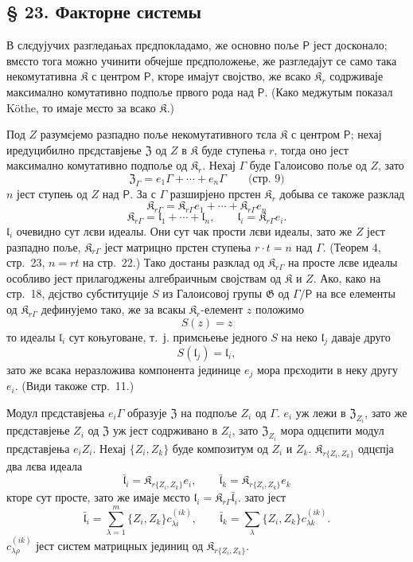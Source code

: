 \documentclass[11pt]{article}
\newcommand{\foreign}[1]{#1}
\begin{document}
\subsection*{§ 23. Факторне системы}\label{faktorensysteme}

В слєдујучих разгледањах прєдпокладамо, же основно поље \(\mathsf P\) јест досконало; вмєсто тога можно учинити обчејше прєдположење, же разгледајут се само така некомутативна \(\mathfrak K\) с центром \(\mathsf P\), кторе имајут својство, же всако \(\mathfrak K_r\) содрживаје максимално комутативно подпоље првого рода над \(\mathsf P\). (Како меджутым показал \foreign{Köthe}, то имаје мєсто за всако \(\mathfrak K\).)

Под \(Z\) разумєјемо разпадно поље некомутативного тєла \(\mathfrak K\) с центром \(\mathsf P\); нехај иредуцибилно прєдставјење \(\mathfrak Z\) од \(Z\) в \(\mathfrak K\) буде ступења \(r\), тогда оно јест максимално комутативно подпоље од \(\mathfrak K_r\). Нехај \(\Gamma\) буде Галоисово поље од \(Z\), зато
\[
\mathfrak Z_\Gamma=e_1\Gamma+\cdots+e_n\Gamma
\qquad\text{(стр.~9)}
\]
\(n\) јест ступењ од \(Z\) над \(\mathsf P\). За с \(\Gamma\) разширјено прстен \(\mathfrak K_r\) добыва се такоже разклад
\[
\mathfrak K_{r\Gamma}=\mathfrak K_{r\Gamma}e_1+\cdots+\mathfrak K_{r\Gamma}e_n
\]
\[
\mathfrak K_{r\Gamma}=\mathfrak l_1+\cdots+\mathfrak l_n,\qquad
\mathfrak l_i=\mathfrak K_{r\Gamma}e_i.
\]
\(\mathfrak l_i\) очевидно сут лєви идеалы. Они сут чак прости лєви идеалы, зато же \(Z\) јест разпадно поље, \(\mathfrak K_{r\Gamma}\) јест матрицно прстен ступења \(r\cdot t=n\) над \(\Gamma\). (Теорем 4, стр.~23, \(n=rt\) на стр.~22.) Тако достаны разклад од \(\mathfrak K_{r\Gamma}\) на просте лєве идеалы особливо јест прилагоджены алгебраичным својствам од \(\mathfrak K\) и \(Z\). Ако, како на стр.~18, дєјство субституције \(S\) из Галоисовој групы \(\mathfrak G\) од \(\Gamma/\mathsf P\) на все елементы од \(\mathfrak K_{r\Gamma}\) дефинујемо тако, же за всакы \(\mathfrak K_r\)-елемент \(z\) положимо
\[
S(z)=z
\]
то идеалы \(\mathfrak l_i\) сут коњуговане, т.~ј. примєњење једного \(S\) на неко \(\mathfrak l_j\) даваје друго
\[
S(\mathfrak l_j)=\mathfrak l_i,
\]
зато же всака неразложива компонента јединице \(e_j\) мора прєходити в неку другу \(e_i\). (Види такоже стр.~11.)

Модул прєдставјења \(e_i\Gamma\) образује \(\mathfrak Z\) на подпоље \(Z_i\) од \(\Gamma\). \(e_i\) уж лежи в \(\mathfrak Z_{Z_i}\), зато же прєдставјење \(Z_i\) од \(\mathfrak Z\) уж јест содрживано в \(Z_i\), зато \(\mathfrak Z_{Z_i}\) мора одцєпити модул прєдставјења \(e_iZ_i\). Нехај \(\{Z_i,Z_k\}\) буде композитум од \(Z_i\) и \(Z_k\). \(\mathfrak K_{r\{Z_i,Z_k\}}\) одцєпја два лєва идеала
\[
\bar{\mathfrak l}_i=\mathfrak K_{r\{Z_i,Z_k\}}e_i,\qquad
\bar{\mathfrak l}_k=\mathfrak K_{r\{Z_i,Z_k\}}e_k
\]
кторе сут просте, зато же имаје мєсто \(\mathfrak l_i=\mathfrak K_{r\Gamma}\bar{\mathfrak l}_i\). зато јест
\[
\bar{\mathfrak l}_i=\sum_{\lambda=1}^m\{Z_i,Z_k\}c_{\lambda i}^{(ik)},\qquad
\bar{\mathfrak l}_k=\sum_{\lambda}\{Z_i,Z_k\}c_{\lambda k}^{(ik)}.
\]
\(c_{\lambda\rho}^{(ik)}\) јест систем матрицных јединиц од \(\mathfrak K_{r\{Z_i,Z_k\}}\).
\end{document}
